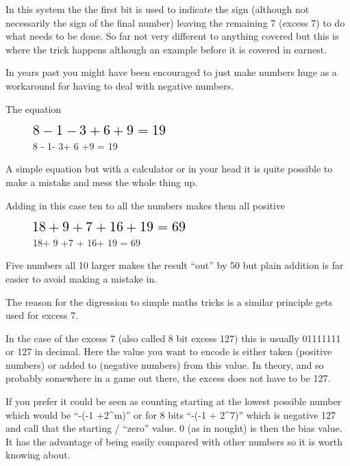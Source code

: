\documentclass[
]{book}
\begin{document}
In this system the the first bit is used to indicate the sign (although not necessarily the sign of the final number) leaving the remaining 7 (excess 7) to do what needs to be done. So far not very different to anything covered but this is where the trick happens although an example before it is covered in earnest.

In years past you might have been encouraged to just make numbers huge as a workaround for having to deal with negative numbers.

The equation

\begin{figure}
\centering
\includegraphics{images/romhacking20200x.png}
\caption{8 - 1- 3+ 6 +9 = 19}
\end{figure}

A simple equation but with a calculator or in your head it is quite possible to make a mistake and mess the whole thing up.

Adding in this case ten to all the numbers makes them all positive

\begin{figure}
\centering
\includegraphics{images/romhacking20201x.png}
\caption{18+ 9 +7 + 16+ 19 = 69}
\end{figure}

Five numbers all 10 larger makes the result ``out'' by 50 but plain addition is far easier to avoid making a mistake in.

The reason for the digression to simple maths tricks is a similar principle gets used for excess 7.

In the case of the excess 7 (also called 8 bit excess 127) this is usually 01111111 or 127 in decimal. Here the value you want to encode is either taken (positive numbers) or added to (negative numbers) from this value. In theory, and so probably somewhere in a game out there, the excess does not have to be 127.

If you prefer it could be seen as counting starting at the lowest possible number which would be ``-(-1 +2\^{}m)'' or for 8 bits ``-(-1 + 2\^{}7)'' which is negative 127 and call that the starting / ``zero'' value. 0 (as in nought) is then the bias value. It has the advantage of being easily compared with other numbers so it is worth knowing about.
\end{document}
